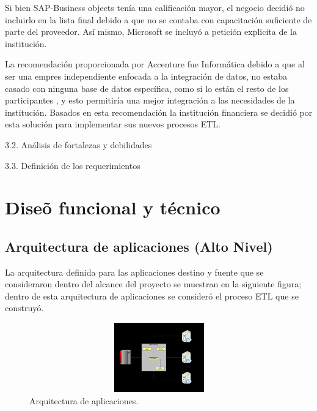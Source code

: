 \documentclass[a4paper,openright,12pt]{book}
\begin{document}
Si bien SAP-Business objects ten\'ia una calificaci\'on mayor, el negocio decidi\'o no incluirlo en la lista final debido a que no se contaba con capacitaci\'on suficiente de parte del proveedor. Así mismo, Microsoft se incluy\'o a petici\'on explicita de la instituci\'on. 

La recomendaci\'on proporcionada por Accenture fue Inform\'atica debido a que al ser una empres independiente enfocada a la integraci\'on de datos, no estaba casado con ninguna base de datos espec\'ifica, como si lo est\'an el resto de los participantes , y esto permitir\'ia una mejor integraci\'on a las necesidades de la instituci\'on. Basados en esta recomendaci\'on la instituci\'on financiera se decidi\'o por esta soluci\'on para implementar sus nuevos procesos ETL.


3.2. An\'alisis de fortalezas y debilidades

3.3. Definici\'on de los requerimientos

\chapter*{Dise\~o funcional y t\'ecnico} \label{cap.diseno}%

\section{Arquitectura de aplicaciones (Alto Nivel)}
La arquitectura definida para las aplicaciones destino y fuente que se consideraron dentro del alcance del proyecto se muestran en la siguiente figura; dentro de esta arquitectura de aplicaciones se consider\'o el proceso ETL que se construy\'o.

\begin{figure}[htb]
  \begin{center}
    \includegraphics[width=12cm, height=3cm, scale=0.5]{Arquitectura.jpg}
        \caption{Arquitectura de aplicaciones.}
    \label{fig:arquitectura}
  \end{center}
\end{figure}
\end{document}
